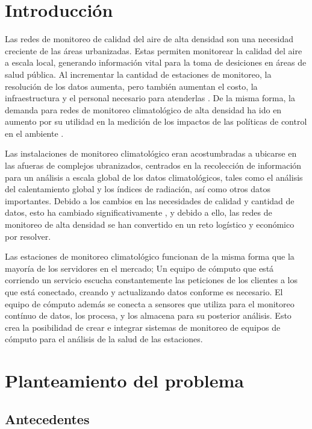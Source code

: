 \section{Introducción}

Las redes de monitoreo de calidad del aire de alta densidad son una necesidad creciente de las áreas urbanizadas. Estas permiten monitorear la calidad del aire a escala local, generando información vital para la toma de desiciones en áreas de salud pública. Al incrementar la cantidad de estaciones de monitoreo, la resolución de los datos aumenta, pero también aumentan el costo, la infraestructura y el personal necesario para atenderlas \cite{urban_air_quality}. De la misma forma, la demanda para redes de monitoreo climatológico de alta densidad ha ido en aumento por su utilidad en la medición de los impactos de las políticas de control en el ambiente \cite{muller_sensors_and_the_city}.

Las instalaciones de monitoreo climatológico eran acostumbradas a ubicarse en las afueras de complejos ubranizados, centrados en la recolección de información para un análisis a escala global de los datos climatológicos, tales como el análisis del calentamiento global y los índices de radiación, así como otros datos importantes. Debido a los cambios en las necesidades de calidad y cantidad de datos, esto ha cambiado significativamente \cite{oke_2004}, y debido a ello, las redes de monitoreo de alta densidad se han convertido en un reto logístico y económico por resolver.

Las estaciones de monitoreo climatológico funcionan de la misma forma que la mayoría de los servidores en el mercado; Un equipo de cómputo que está corriendo un servicio escucha constantemente las peticiones de los clientes a los que está conectado, creando y actualizando datos conforme es necesario. El equipo de cómputo además se conecta a sensores que utiliza para el monitoreo contínuo de datos, los procesa, y los almacena para su posterior análisis. Esto crea la posibilidad de crear e integrar sistemas de monitoreo de equipos de cómputo para el análisis de la salud de las estaciones.

\pagebreak

\section{Planteamiento del problema}

\subsection{Antecedentes}

